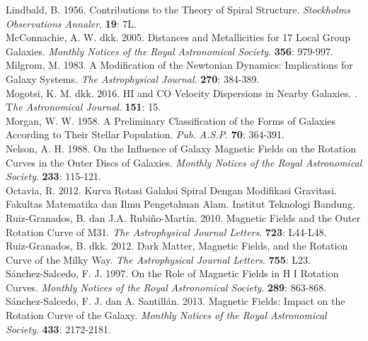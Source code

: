 \begin{thebibliography}{}
Lindbald, B. 1956. Contributions to the Theory of Spiral Structure. \textit{Stockholms Observations Annaler}. \textbf{19}: 7L.\\

McConnachie, A. W. dkk. 2005. Distances and Metallicities for 17 Local Group Galaxies. \textit{Monthly Notices of the Royal Astronomical Society}. \textbf{356}: 979-997.\\

Milgrom, M. 1983. A Modification of the Newtonian Dynamics: Implications for Galaxy Systems. \textit{The Astrophysical Journal}. \textbf{270}: 384-389.  \\

Mogotsi, K. M. dkk.  2016.  HI  and CO Velocity Dispersions in Nearby  Galaxies. . T\textit{he Astronomical Journal}. \textbf{151}: 15.\\

Morgan, W. W. 1958. A Preliminary Classification of the Forms of Galaxies According to Their Stellar Population. \textit{Pub. A.S.P}. \textbf{70}: 364-391.\\

Nelson, A. H. 1988. On the Influence of Galaxy Magnetic Fields on the Rotation Curves in the Outer Discs of Galaxies. \textit{Monthly Notices of the Royal Astronomical Society}. \textbf{233}: 115-121. \\

Octavia, R. 2012. Kurva Rotasi Galaksi Spiral Dengan Modifikasi Gravitasi. Fakultas Matematika dan Ilmu Pengetahuan Alam. Institut Teknologi Bandung.\\

Ruiz-Granados,  B. dan J.A. Rubiño-Martín. 2010.  Magnetic Fields and the Outer Rotation Curve of M31. \textit{The Astrophysical Journal Letters}. \textbf{723}: L44-L48. \\
 
Ruiz-Granados, B. dkk. 2012.  Dark Matter, Magnetic Fields, and the Rotation Curve of the Milky Way. \textit{The Astrophysical Journal Letters}. \textbf{755}: L23.\\

S\'anchez-Salcedo, F. J. 1997. On the Role of Magnetic Fields in H I Rotation Curves. \textit{Monthly Notices of the Royal Astronomical Society}. \textbf{289}: 863-868.\\

S\'anchez-Salcedo, F. J. dan  A. Santillán. 2013. Magnetic Fields: Impact on the Rotation Curve of the Galaxy. \textit{Monthly Notices of the Royal Astronomical Society}. \textbf{433}: 2172-2181. \\


\end{thebibliography}
